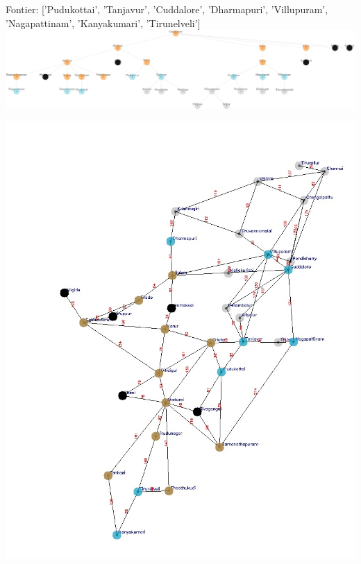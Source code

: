 \documentclass[xcolor=table]{beamer}
\begin{document}
\begin{frame}
  { \tiny Fontier: ['Pudukottai', 'Tanjavur', 'Cuddalore', 'Dharmapuri', 'Villupuram', 'Nagapattinam', 'Kanyakumari', 'Tirunelveli']}
  \includegraphics[width=1\textwidth]{../BFSNodes/23-1.png}
  \begin{center}
    \includegraphics[height=0.6\textheight]{../BFSoutput/tamilBFS21.jpg}
  \end{center}
\end{frame}
\end{document}
